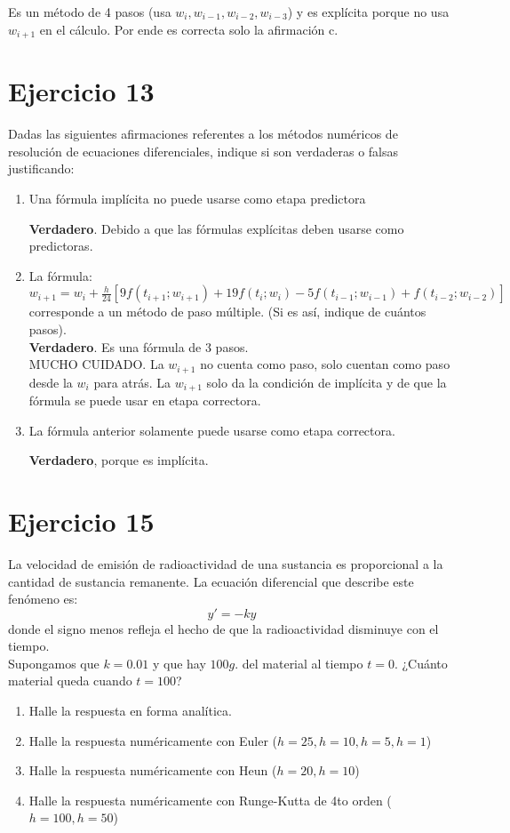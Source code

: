 \documentclass[11pt]{article}
\begin{document}
	Es un método de 4 pasos (usa $w_i,w_{i-1},w_{i-2},w_{i-3}$) y es explícita porque no usa $w_{i+1}$ en el cálculo. Por ende es correcta solo la afirmación c.

	\section{Ejercicio 13}
	Dadas las siguientes afirmaciones referentes a los métodos numéricos de resolución de ecuaciones diferenciales, indique si son verdaderas o falsas justificando:
	
	\begin{enumerate}[label=\alph*)]
		\item Una fórmula implícita no puede usarse como etapa predictora
		
		\textbf{Verdadero}. Debido a que las fórmulas explícitas deben usarse como predictoras.\\
		
		\item La fórmula: $w_{i+1}=w_i+\frac{h}{24}[9f(t_{i+1};w_{i+1})+19f(t_i;w_i)-5f(t_{i-1};w_{i-1})+f(t_{i-2};w_{i-2})]$ corresponde a un método de paso múltiple. (Si es así, indique de cuántos pasos).\\
		
		\textbf{Verdadero}. Es una fórmula de 3 pasos.\\
		MUCHO CUIDADO. La $w_{i+1}$ no cuenta como paso, solo cuentan como paso desde la $w_i$ para atrás. La $w_{i+1}$ solo da la condición de implícita y de que la fórmula se puede usar en etapa correctora.
		
		\item La fórmula anterior solamente puede usarse como etapa correctora.
		
		\textbf{Verdadero}, porque es implícita.
	\end{enumerate}

	\section{Ejercicio 15}
	La velocidad de emisión de radioactividad de una sustancia es proporcional a la cantidad de sustancia remanente. La ecuación diferencial que describe este fenómeno es:
	$$y'=-ky$$
	donde el signo menos refleja el hecho de que la radioactividad disminuye con el tiempo.\\
	Supongamos que $k=0.01$ y que hay $100g.$ del material al tiempo $t=0$. ¿Cuánto material queda cuando $t=100$?
	
	\begin{enumerate}[label=\alph*)]
		\item Halle la respuesta en forma analítica.
		\item Halle la respuesta numéricamente con Euler ($h=25,h=10,h=5,h=1$)
		\item Halle la respuesta numéricamente con Heun ($h=20,h=10$)
		\item Halle la respuesta numéricamente con Runge-Kutta de 4to orden ($h=100,h=50$)
	\end{enumerate}
\end{document}
